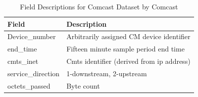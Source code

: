 

\begin{table}[ht!]
\small
\begin{tabular}{|l|l|}
\hline
\textbf{Field}         & \textbf{Description}                      \\ \hline
Device\_number         & Arbitrarily assigned CM device identifier \\ \hline
end\_time              & Fifteen minute sample period end time     \\ \hline
cmts\_inet             & Cmts identifier (derived from ip address) \\ \hline
service\_direction     & 1-downstream, 2-upstream                  \\ \hline
octets\_passed         & Byte count                                \\ \hline
\end{tabular}
\caption{Field Descriptions for Comcast Dataset by Comcast}
\label{tab:field-description}
\end{table}

